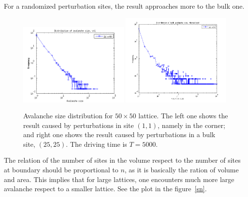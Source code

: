 For a randomized perturbation sites, the result approaches more to the bulk one. 
\begin{figure} 
\begin{center}
\includegraphics[width=0.49\textwidth]{results/sv1.png}
\includegraphics[width=0.49\textwidth]{results/sbulk_th.png} 
\caption{Avalanche size distribution for $50\times50$ lattice. 
The left one shows the result caused by perturbations in site $(1,1)$, namely in the corner; 
and right one shows the result caused by perturbations in a bulk site, $(25,25)$. The driving time is $T=5000$.  }
\label{sv}
\end{center}
\end{figure} 


The relation of the number of sites in the volume respect to the number of sites at boundary should be proportional to $n$, as it is basically the ration of volume and area.
This implies that for large lattices, one encounters much more large avalanche respect to a smaller lattice. See the plot in the figure~\ref{sn}.

